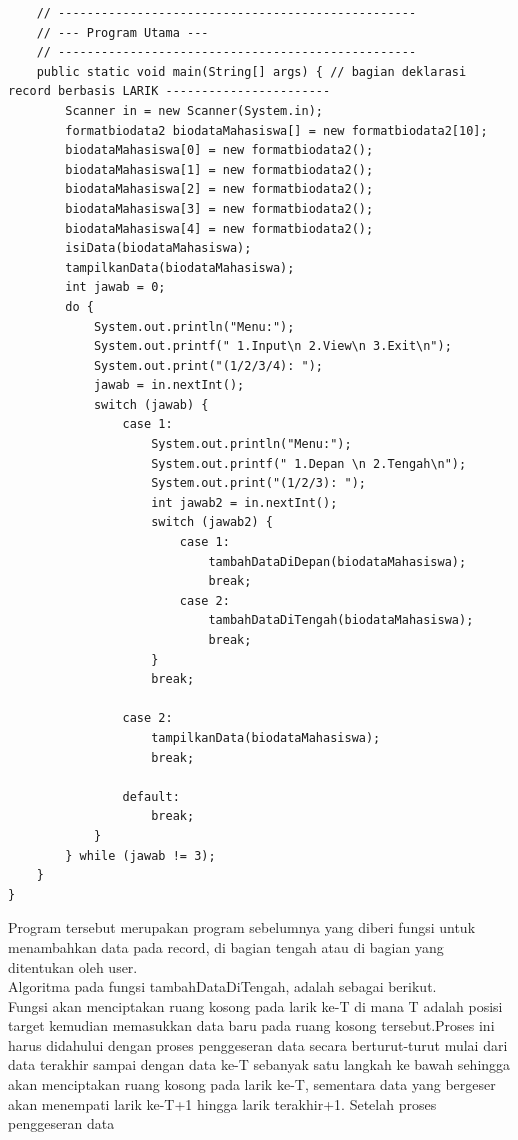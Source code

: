 \documentclass[a4paper,12pt]{article}
\begin{document}
\begin{lstlisting}
    // --------------------------------------------------
    // --- Program Utama ---
    // --------------------------------------------------
    public static void main(String[] args) { // bagian deklarasi record berbasis LARIK -----------------------
        Scanner in = new Scanner(System.in);
        formatbiodata2 biodataMahasiswa[] = new formatbiodata2[10];
        biodataMahasiswa[0] = new formatbiodata2();
        biodataMahasiswa[1] = new formatbiodata2();
        biodataMahasiswa[2] = new formatbiodata2();
        biodataMahasiswa[3] = new formatbiodata2();
        biodataMahasiswa[4] = new formatbiodata2();
        isiData(biodataMahasiswa);
        tampilkanData(biodataMahasiswa);
        int jawab = 0;
        do {
            System.out.println("Menu:");
            System.out.printf(" 1.Input\n 2.View\n 3.Exit\n");
            System.out.print("(1/2/3/4): ");
            jawab = in.nextInt();
            switch (jawab) {
                case 1:
                    System.out.println("Menu:");
                    System.out.printf(" 1.Depan \n 2.Tengah\n");
                    System.out.print("(1/2/3): ");
                    int jawab2 = in.nextInt();
                    switch (jawab2) {
                        case 1:
                            tambahDataDiDepan(biodataMahasiswa);
                            break;
                        case 2:
                            tambahDataDiTengah(biodataMahasiswa);
                            break;
                    }
                    break;

                case 2:
                    tampilkanData(biodataMahasiswa);
                    break;

                default:
                    break;
            }
        } while (jawab != 3);
    }
}
\end{lstlisting}
Program tersebut merupakan program sebelumnya yang diberi fungsi untuk menambahkan data pada record, di bagian tengah
atau di bagian yang ditentukan oleh user.\\
Algoritma pada fungsi tambahDataDiTengah, adalah sebagai berikut.\\
Fungsi akan menciptakan  ruang kosong pada larik ke-T di mana T adalah posisi target kemudian memasukkan data baru pada
ruang kosong tersebut.Proses ini harus didahului dengan proses penggeseran data secara berturut-turut mulai dari data
terakhir sampai dengan data ke-T sebanyak satu langkah ke bawah sehingga akan menciptakan ruang kosong pada larik
ke-T, sementara data yang bergeser akan menempati larik ke-T+1 hingga larik terakhir+1. Setelah proses penggeseran data
\end{document}
